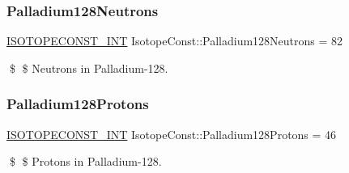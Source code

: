 \subsubsection{\texorpdfstring{Palladium128\+Neutrons}{Palladium128Neutrons}}
{\footnotesize\ttfamily \mbox{\hyperlink{group___isotope_const-_macros_ga5f18360b3e99483a35c32d789e62621c}{I\+S\+O\+T\+O\+P\+E\+C\+O\+N\+S\+T\+\_\+\+I\+NT}} Isotope\+Const\+::\+Palladium128\+Neutrons = 82}

\$ \$ Neutrons in Palladium-\/128. \mbox{\label{group___isotope_const-_palladium-_pd128_ga0198876df0e435450a848d64a687ba74}} 
\subsubsection{\texorpdfstring{Palladium128\+Protons}{Palladium128Protons}}
{\footnotesize\ttfamily \mbox{\hyperlink{group___isotope_const-_macros_ga5f18360b3e99483a35c32d789e62621c}{I\+S\+O\+T\+O\+P\+E\+C\+O\+N\+S\+T\+\_\+\+I\+NT}} Isotope\+Const\+::\+Palladium128\+Protons = 46}

\$ \$ Protons in Palladium-\/128. 